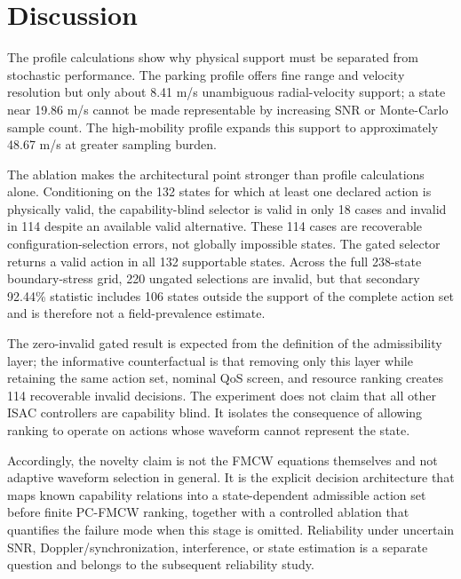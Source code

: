 \documentclass[journal]{IEEEtran}
\begin{document}
\figPaperOneCapability
\figPaperOnePilot


\section{Discussion}
The profile calculations show why physical support must be separated from stochastic performance. The parking profile offers fine range and velocity resolution but only about 8.41 m/s unambiguous radial-velocity support; a state near 19.86 m/s cannot be made representable by increasing SNR or Monte-Carlo sample count. The high-mobility profile expands this support to approximately 48.67 m/s at greater sampling burden.

The ablation makes the architectural point stronger than profile calculations alone. Conditioning on the 132 states for which at least one declared action is physically valid, the capability-blind selector is valid in only 18 cases and invalid in 114 despite an available valid alternative. These 114 cases are recoverable configuration-selection errors, not globally impossible states. The gated selector returns a valid action in all 132 supportable states. Across the full 238-state boundary-stress grid, 220 ungated selections are invalid, but that secondary 92.44\% statistic includes 106 states outside the support of the complete action set and is therefore not a field-prevalence estimate.

The zero-invalid gated result is expected from the definition of the admissibility layer; the informative counterfactual is that removing only this layer while retaining the same action set, nominal QoS screen, and resource ranking creates 114 recoverable invalid decisions. The experiment does not claim that all other ISAC controllers are capability blind. It isolates the consequence of allowing ranking to operate on actions whose waveform cannot represent the state.

Accordingly, the novelty claim is not the FMCW equations themselves and not adaptive waveform selection in general. It is the explicit decision architecture that maps known capability relations into a state-dependent admissible action set before finite PC-FMCW ranking, together with a controlled ablation that quantifies the failure mode when this stage is omitted. Reliability under uncertain SNR, Doppler/synchronization, interference, or state estimation is a separate question and belongs to the subsequent reliability study.
\end{document}
